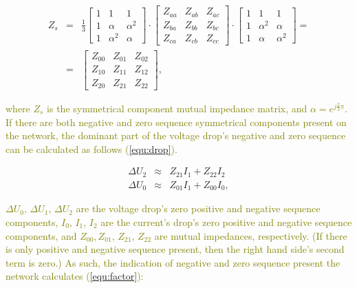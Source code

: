             \begin{equation}
                \begin{array}{rcl}
                       Z_s&=&\frac{1}{3}\begin{bmatrix} 1&1&1\\1&\alpha&\alpha^2\\1&\alpha^2&\alpha \end{bmatrix}\cdot
                                        \begin{bmatrix} Z_{aa}&Z_{ab}&Z_{ac}\\Z_{ba}&Z_{bb}&Z_{bc}\\Z_{ca}&Z_{cb}&Z_{cc} \end{bmatrix}\cdot
                                        \begin{bmatrix} 1&1&1\\1&\alpha^2&\alpha\\1&\alpha&\alpha^2\end{bmatrix}=\\
                          &=&  \begin{bmatrix} Z_{00}&Z_{01}&Z_{02}\\Z_{10}&Z_{11}&Z_{12}\\Z_{20}&Z_{21}&Z_{22} \end{bmatrix},

                \end{array}
                \label{equ:mutual}
            \end{equation}

            \textcolor{olive}{where $Z_s$ is the symmetrical component mutual impedance matrix, and $\alpha=e^{j\frac{2}{3}\pi}$. If there are both negative and zero sequence symmetrical components present on the network, the dominant part of the voltage drop's negative and zero sequence can be calculated as follows (\ref{equ:drop}).}

            \begin{equation}
                \begin{array}{rcl}
                       \Delta U_2&\approx&Z_{21}I_1+Z_{22}I_2\\
                       \Delta U_0&\approx&Z_{01}I_1+Z_{00}I_0,
                \end{array}
                \label{equ:drop}
            \end{equation}

            \textcolor{olive}{$\Delta U_0,\,\Delta U_1,\,\Delta U_2$ are the voltage drop's zero positive and negative sequence components, $I_0,\,I_1,\,I_2$ are the current's drop's zero positive and negative sequence components, and $Z_{00},Z_{01},\,Z_{21},\,Z_{22}$ are mutual impedances,  respectively. (If there is only positive and negative sequence present, then the right hand side's second term is zero.) As such, the indication of negative and zero sequence present the network calculates (\ref{equ:factor}):}

